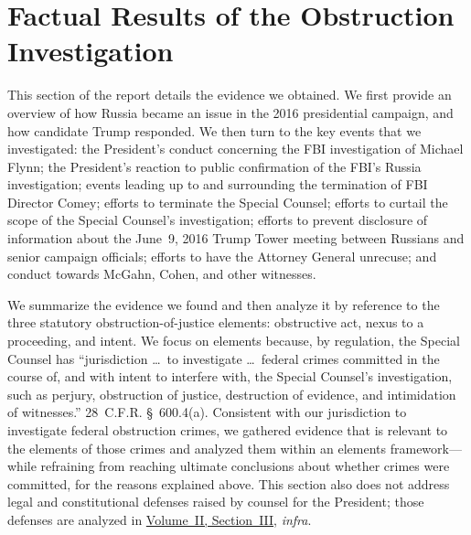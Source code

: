 \section{Factual Results of the Obstruction Investigation}

This section of the report details the evidence we obtained.
We first provide an overview of how Russia became an issue in the 2016 presidential campaign, and how candidate Trump responded.
We then turn to the key events that we investigated: the President's conduct concerning the FBI investigation of Michael Flynn;
the President's reaction to public confirmation of the FBI's Russia investigation; events leading up to and surrounding the termination of FBI Director Comey;
efforts to terminate the Special Counsel; efforts to curtail the scope of the Special Counsel's investigation;
efforts to prevent disclosure of information about the June~9, 2016 Trump Tower meeting between Russians and senior campaign officials; efforts to have the Attorney General unrecuse;
and conduct towards McGahn, Cohen, and other witnesses.

We summarize the evidence we found and then analyze it by reference to the three statutory obstruction-of-justice elements: obstructive act, nexus to a proceeding, and intent.
We focus on elements because, by regulation, the Special Counsel has ``jurisdiction \dots\ to investigate \dots\ federal crimes committed in the course of, and with intent to interfere with, the Special Counsel's investigation, such as perjury, obstruction of justice, destruction of evidence, and intimidation of witnesses.''
28~C.F.R. \S~600.4(a).
Consistent with our jurisdiction to investigate federal obstruction crimes, we gathered evidence that is relevant to the elements of those crimes and analyzed them within an elements framework---while refraining from reaching ultimate conclusions about whether crimes were committed, for the reasons explained above.
This section also does not address legal and constitutional defenses raised by counsel for the President; those defenses are analyzed in \hyperlink{section.2.3}{Volume~II, Section~III}, \textit{infra}.

